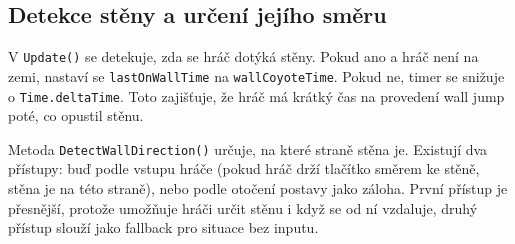 \subsection{Detekce stěny a určení jejího směru}

V \texttt{Update()} se detekuje, zda se hráč dotýká stěny. Pokud ano a hráč není na zemi, nastaví se \texttt{lastOnWallTime} na \texttt{wallCoyoteTime}. Pokud ne, timer se snižuje o \texttt{Time.deltaTime}. Toto zajišťuje, že hráč má krátký čas na provedení wall jump poté, co opustil stěnu.

Metoda \texttt{DetectWallDirection()} určuje, na které straně stěna je. Existují dva přístupy: buď podle vstupu hráče (pokud hráč drží tlačítko směrem ke stěně, stěna je na této straně), nebo podle otočení postavy jako záloha. První přístup je přesnější, protože umožňuje hráči určit stěnu i když se od ní vzdaluje, druhý přístup slouží jako fallback pro situace bez inputu.